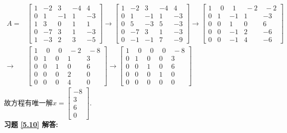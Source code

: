 \begin{displaymath}
\begin{aligned}
A=&\begin{bmatrix}  1&-2&3&-4&4\\0&1&-1&1&-3\\1&3&0&1&1\\0&-7&3&1&-3\\1&-3&2&3&-5 \end{bmatrix}\rightarrow
\begin{bmatrix}1&-2&3&-4&4\\0&1&-1&1&-3\\0&5&-3&5&-3\\0&-7&3&1&-3\\0&-1&-1&7&-9   \end{bmatrix}\rightarrow
\begin{bmatrix}1&\ \ 0&\ \ 1&\ -2&\ -2\\0&1&-1&1&-3\\0&0&1&0&6\\0&0&-1&2&-6\\0&0&-1&4&-6  \end{bmatrix}\\ \rightarrow&
\begin{bmatrix}1&\ \ 0&\ \ 0&\ -2&\ -8\\0&1&0&1&3\\0&0&1&0&6\\0&0&0&2&0\\0&0&0&4&0   \end{bmatrix}\rightarrow
\begin{bmatrix} 1&\ \ 0&\ \ 0&\ \ 0&\ -8\\0&1&0&0&3\\0&0&1&0&6\\0&0&0&1&0\\0&0&0&0&0  \end{bmatrix} \end{aligned} \end{displaymath}
故方程有唯一解$x=\begin{bmatrix}-8\\3\\6\\0\end{bmatrix}$.\\
\textbf{习题 \ref{5.10} 解答:}\\

